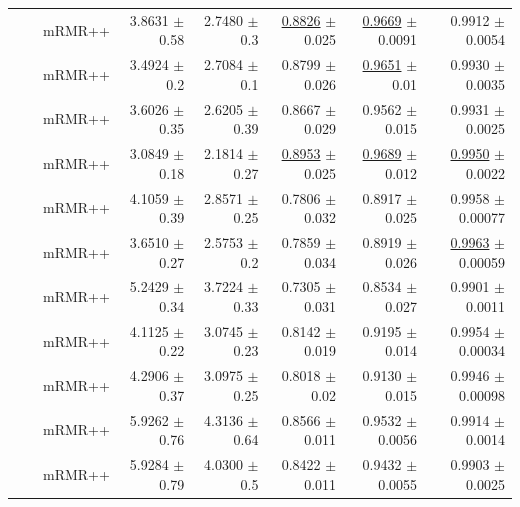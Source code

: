 \begin{longtable}{llp{}rrrrr}
 &  & mRMR++ & 3.8631 {\scriptsize $\pm$ 0.58} & 2.7480 {\scriptsize $\pm$ 0.3} & \underline{0.8826} {\scriptsize $\pm$ 0.025} & \underline{0.9669} {\scriptsize $\pm$ 0.0091} & 0.9912 {\scriptsize $\pm$ 0.0054} \\
 &  & mRMR++ & 3.4924 {\scriptsize $\pm$ 0.2} & 2.7084 {\scriptsize $\pm$ 0.1} & 0.8799 {\scriptsize $\pm$ 0.026} & \underline{0.9651} {\scriptsize $\pm$ 0.01} & 0.9930 {\scriptsize $\pm$ 0.0035} \\
 &  & mRMR++ & 3.6026 {\scriptsize $\pm$ 0.35} & 2.6205 {\scriptsize $\pm$ 0.39} & 0.8667 {\scriptsize $\pm$ 0.029} & 0.9562 {\scriptsize $\pm$ 0.015} & 0.9931 {\scriptsize $\pm$ 0.0025} \\
 &  & mRMR++ & 3.0849 {\scriptsize $\pm$ 0.18} & 2.1814 {\scriptsize $\pm$ 0.27} & \underline{0.8953} {\scriptsize $\pm$ 0.025} & \underline{0.9689} {\scriptsize $\pm$ 0.012} & \underline{0.9950} {\scriptsize $\pm$ 0.0022} \\
 &  & mRMR++ & 4.1059 {\scriptsize $\pm$ 0.39} & 2.8571 {\scriptsize $\pm$ 0.25} & 0.7806 {\scriptsize $\pm$ 0.032} & 0.8917 {\scriptsize $\pm$ 0.025} & 0.9958 {\scriptsize $\pm$ 0.00077} \\
 &  & mRMR++ & 3.6510 {\scriptsize $\pm$ 0.27} & 2.5753 {\scriptsize $\pm$ 0.2} & 0.7859 {\scriptsize $\pm$ 0.034} & 0.8919 {\scriptsize $\pm$ 0.026} & \underline{0.9963} {\scriptsize $\pm$ 0.00059} \\
 &  & mRMR++ & 5.2429 {\scriptsize $\pm$ 0.34} & 3.7224 {\scriptsize $\pm$ 0.33} & 0.7305 {\scriptsize $\pm$ 0.031} & 0.8534 {\scriptsize $\pm$ 0.027} & 0.9901 {\scriptsize $\pm$ 0.0011} \\
 &  & mRMR++ & 4.1125 {\scriptsize $\pm$ 0.22} & 3.0745 {\scriptsize $\pm$ 0.23} & 0.8142 {\scriptsize $\pm$ 0.019} & 0.9195 {\scriptsize $\pm$ 0.014} & 0.9954 {\scriptsize $\pm$ 0.00034} \\
 &  & mRMR++ & 4.2906 {\scriptsize $\pm$ 0.37} & 3.0975 {\scriptsize $\pm$ 0.25} & 0.8018 {\scriptsize $\pm$ 0.02} & 0.9130 {\scriptsize $\pm$ 0.015} & 0.9946 {\scriptsize $\pm$ 0.00098} \\
 &  & mRMR++ & 5.9262 {\scriptsize $\pm$ 0.76} & 4.3136 {\scriptsize $\pm$ 0.64} & 0.8566 {\scriptsize $\pm$ 0.011} & 0.9532 {\scriptsize $\pm$ 0.0056} & 0.9914 {\scriptsize $\pm$ 0.0014} \\
 &  & mRMR++ & 5.9284 {\scriptsize $\pm$ 0.79} & 4.0300 {\scriptsize $\pm$ 0.5} & 0.8422 {\scriptsize $\pm$ 0.011} & 0.9432 {\scriptsize $\pm$ 0.0055} & 0.9903 {\scriptsize $\pm$ 0.0025} \\

\end{longtable}
